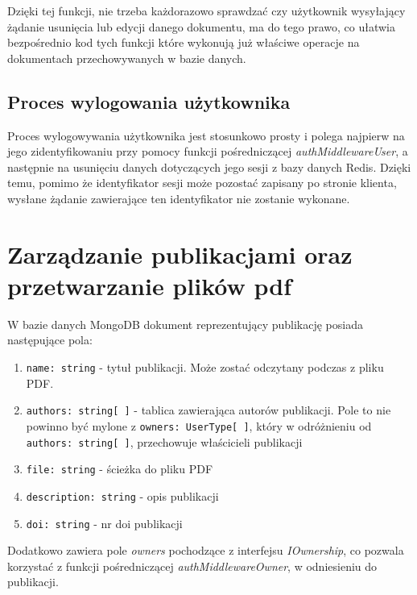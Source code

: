 \documentclass[a4paper,12pt,twoside,openany]{report}
\begin{document}
Dzięki tej funkcji, nie trzeba każdorazowo sprawdzać czy użytkownik wysyłający żądanie usunięcia lub edycji danego dokumentu, ma do tego prawo, co ułatwia bezpośrednio kod tych funkcji które wykonują już właściwe operacje na dokumentach przechowywanych w bazie danych.

\subsection{Proces wylogowania użytkownika}
Proces wylogowywania użytkownika jest stosunkowo prosty i polega najpierw na jego zidentyfikowaniu przy pomocy funkcji pośredniczącej \textit{authMiddlewareUser}, a następnie na usunięciu danych dotyczących jego sesji z bazy danych Redis. Dzięki temu, pomimo że identyfikator sesji może pozostać zapisany po stronie klienta, wysłane żądanie zawierające ten identyfikator nie zostanie wykonane.
\newpage
\section{Zarządzanie publikacjami oraz przetwarzanie plików pdf}
W bazie danych MongoDB dokument reprezentujący publikację posiada następujące pola: 
\begin{enumerate}
	
	\item \verb|name: string| - tytuł publikacji. Może zostać odczytany podczas  z pliku PDF.
	
	\item \verb|authors: string[ ]| - tablica zawierająca autorów publikacji. Pole to nie powinno być mylone z \verb|owners: UserType[ ]|, który w odróżnieniu od \verb|authors: string[ ]|, przechowuje właścicieli publikacji
	
	\item \verb|file: string| - ścieżka do pliku PDF 
	
	\item \verb|description: string| - opis publikacji
	
	\item \verb|doi: string| - nr doi publikacji
\end{enumerate}
Dodatkowo zawiera pole \textit{owners} pochodzące z interfejsu \textit{IOwnership}, co pozwala korzystać z funkcji pośredniczącej \textit{authMiddlewareOwner}, w odniesieniu do publikacji.
\end{document}
